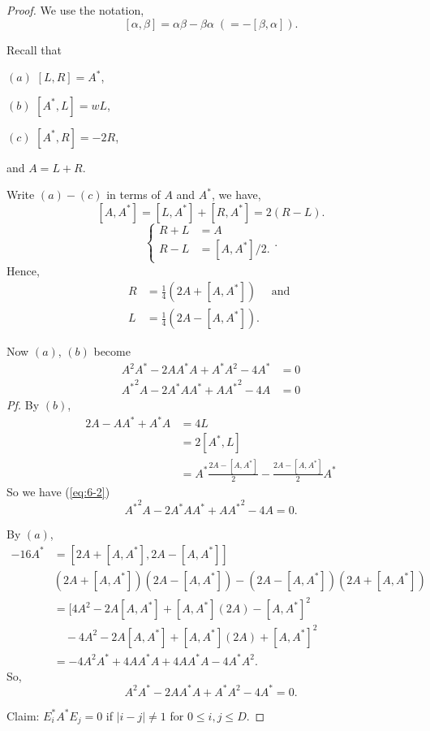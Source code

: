 \documentclass[
]{book}
\theoremstyle{definition}
\theoremstyle{definition}
\theoremstyle{definition}
\theoremstyle{definition}
\theoremstyle{remark}
\begin{document}
\begin{proof}
We use the notation,
\[[\alpha, \beta] = \alpha\beta - \beta\alpha \; (=-[\beta, \alpha]).\]

Recall that

\((a)\) \([L, R] = A^*\),

\((b)\) \([A^*, L] = wL\),

\((c)\) \([A^*, R] = -2R\),

and \(A = L + R\).

Write \((a) - (c)\) in terms of \(A\) and \(A^*\), we have,
\[[A, A^*] = [L, A^*]+ [R, A^*] = 2(R-L).\]
\[\begin{cases} R + L & = A\\
R-L & = [A,A^*]/2. \end{cases}.\]
Hence,
\begin{align}
R & = \frac{1}{4}(2A + [A, A^*]) \quad \text{ and }\\
L & = \frac{1}{4}(2A - [A, A^*]).
\end{align}

Now \((a)\), \((b)\) become
\begin{align}
A^2A^* - 2AA^*A + A^*A^2 - 4A^*  & = 0  \label{eq:6-1}\\
{A^*}^2A - 2A^*AA^* + A{A^*}^2 - 4A  & = 0 \label{eq:6-2}
\end{align}
\emph{Pf.} \quad By \((b)\),
\begin{align}
2A - AA^* + A^*A & = 4L\\
& = 2[A^*, L]\\
& = A^* \frac{2A - [A,A^*]}{2} - \frac{2A - [A, A^*]}{2}A^*
\end{align}
So we have (\eqref{eq:6-2})
\[
{A^*}^2A - 2A^*AA^* + A{A^*}^2 - 4A   = 0.
\]

By \((a)\),
\begin{align}
-16A^* & = [2A + [A, A^*], 2A - [A, A^*]]\\
& (2A + [A, A^*])(2A - [A, A^*]) - (2A - [A,A^*])(2A + [A, A^*])\\
& = [4A^2 - 2A[A, A^*] + [A, A^*](2A) - [A,A^*]^2\\
& \quad - 4A^2 - 2A[A, A^*] + [A, A^*](2A) + [A, A^*]^2\\
& = -4A^2A^* + 4AA^*A + 4AA^*A - 4A^*A^2.
\end{align}
So,
\[A^2A^* - 2AA^*A + A^*A^2 - 4A^* = 0.\]

Claim: \(E_i^*A^*E_j = 0\) if \(|i-j| \neq 1\) for \(0\leq i, j\leq D\).


\end{proof}
\end{document}
